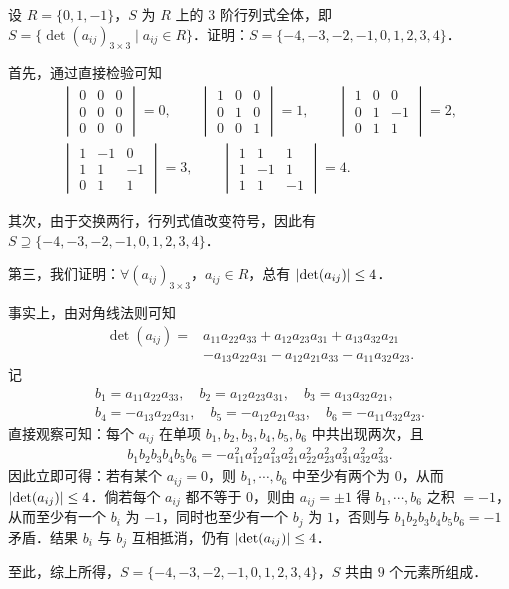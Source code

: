 设 $R=\{0,1,-1\}$，$S$ 为 $R$ 上的 3 阶行列式全体，即 $S=\{\det(a_{ij})_{3\times3}\mid a_{ij}\in R\}$．证明：$S=\{-4,-3,-2,-1,0,1,2,3,4\}$．
\begin{solution}
首先，通过直接检验可知
\[
\begin{gathered}
  \begin{vmatrix}0&0&0\\0&0&0\\0&0&0\end{vmatrix}=0,\qquad
  \begin{vmatrix}1&0&0\\0&1&0\\0&0&1\end{vmatrix}=1,\qquad
  \begin{vmatrix}1&0&0\\0&1&-1\\0&1&1\end{vmatrix}=2,\\
  \begin{vmatrix}1&-1&0\\1&1&-1\\0&1&1\end{vmatrix}=3,\qquad
  \begin{vmatrix}1&1&1\\1&-1&1\\1&1&-1\end{vmatrix}=4.
\end{gathered}
\]

其次，由于交换两行，行列式值改变符号，因此有 $S\supseteq\{-4,-3,-2,-1,0,1,2,3,4\}$．

第三，我们证明：$\forall(a_{ij})_{3\times3}$，$a_{ij}\in R$，总有 $\left|\det(a_{ij})\right|\le4$．

事实上，由对角线法则可知
\begin{align*}
  \det(a_{ij})={}&a_{11}a_{22}a_{33}+a_{12}a_{23}a_{31}+a_{13}a_{32}a_{21}\\
  &-a_{13}a_{22}a_{31}-a_{12}a_{21}a_{33}-a_{11}a_{32}a_{23}.
\end{align*}
记
\begin{align*}
  b_1=a_{11}a_{22}a_{33},\quad b_2=a_{12}a_{23}a_{31},\quad b_3=a_{13}a_{32}a_{21},\\
  b_4=-a_{13}a_{22}a_{31},\quad b_5=-a_{12}a_{21}a_{33},\quad b_6=-a_{11}a_{32}a_{23}.
\end{align*}
直接观察可知：每个 $a_{ij}$ 在单项 $b_1,b_2,b_3,b_4,b_5,b_6$ 中共出现两次，且
\begin{align*}
  b_1b_2b_3b_4b_5b_6=-a_{11}^2a_{12}^2a_{13}^2a_{21}^2a_{22}^2a_{23}^2a_{31}^2a_{32}^2a_{33}^2.
\end{align*}
因此立即可得：若有某个 $a_{ij}=0$，则 $b_1,\cdots,b_6$ 中至少有两个为 $0$，从而 $\left|\det(a_{ij})\right|\le4$．倘若每个 $a_{ij}$ 都不等于 $0$，则由 $a_{ij}=\pm1$ 得 $b_1,\cdots,b_6$ 之积 $=-1$，从而至少有一个 $b_i$ 为 $-1$，同时也至少有一个 $b_j$ 为 $1$，否则与 $b_1b_2b_3b_4b_5b_6=-1$ 矛盾．结果 $b_i$ 与 $b_j$ 互相抵消，仍有 $\left|\det(a_{ij})\right|\le4$．

至此，综上所得，$S=\{-4,-3,-2,-1,0,1,2,3,4\}$，$S$ 共由 $9$ 个元素所组成．
\end{solution}

